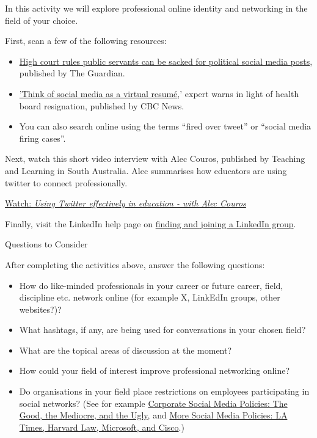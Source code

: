 \documentclass[
]{book}
\providecommand{\tightlist}{%
  \setlength{\itemsep}{0pt}\setlength{\parskip}{0pt}}
\theoremstyle{definition}
\theoremstyle{definition}
\theoremstyle{definition}
\theoremstyle{definition}
\theoremstyle{remark}
\begin{document}
\begin{reflect}
In this activity we will explore professional online identity and networking in the field of your choice.

First, scan a few of the following resources:

\begin{itemize}
\tightlist
\item
  \href{https://www.theguardian.com/australia-news/2019/aug/07/high-court-rules-public-servants-can-be-sacked-for-political-social-media-posts}{High court rules public servants can be sacked for political social media posts}, published by The Guardian.\\
\item
  \href{https://www.cbc.ca/news/canada/saskatoon/experts-surprised-by-what-people-will-say-on-social-media-1.4176138}{'Think of social media as a virtual resumé},' expert warns in light of health board resignation, published by CBC News.\\
\item
  You can also search online using the terms ``fired over tweet'' or ``social media firing cases''.
\end{itemize}

Next, watch this short video interview with Alec Couros, published by Teaching and Learning in South Australia. Alec summarises how educators are using twitter to connect professionally.

\href{https://www.youtube.com/watch?v=EqSCR3HU4eg}{Watch: \emph{Using Twitter effectively in education - with Alec Couros}}

Finally, visit the LinkedIn help page on \href{https://www.linkedin.com/help/linkedin/answer/a544795}{finding and joining a LinkedIn group}.

{Questions to Consider}

After completing the activities above, answer the following questions:

\begin{itemize}
\tightlist
\item
  How do like-minded professionals in your career or future career, field, discipline etc. network online (for example X, LinkEdIn groups, other websites?)?
\item
  What hashtags, if any, are being used for conversations in your chosen field?
\item
  What are the topical areas of discussion at the moment?
\item
  How could your field of interest improve professional networking online?
\item
  Do organisations in your field place restrictions on employees participating in social networks? (See for example \href{https://www.fastcompany.com/1668368/corporate-social-media-policies-good-mediocre-and-ugly}{Corporate Social Media Policies: The Good, the Mediocre, and the Ugly}, and \href{https://www.fastcompany.com/1670530/more-social-media-policies-la-times-harvard-law-microsoft-and-cisco}{More Social Media Policies: LA Times, Harvard Law, Microsoft, and Cisco}.)
\end{itemize}
\end{reflect}
\end{document}

